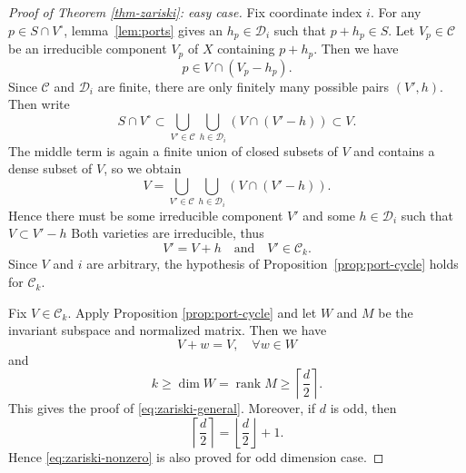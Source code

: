 \documentclass[11pt,reqno]{amsart}
\theoremstyle{definition}
\theoremstyle{plain}
\numberwithin{equation}{section}
\begin{document}
\begin{proof}[Proof of Theorem \ref{thm-zariski}: easy case]
    Fix coordinate index $i$. For any $p\in S\cap V^\circ$, lemma~\ref{lem:ports} gives an $h_p\in \mathcal{D}_i$ such that $p+h_p\in S$. Let $V_p \in \mathcal{C}$ be an irreducible component $V_p$ of $X$ containing $p+h_p$. Then we have
    \begin{equation*}
        p\in V\cap (V_p-h_p).
    \end{equation*}
    Since $\mathcal{C}$ and $\mathcal{D}_i$ are finite, there are only finitely many possible pairs $(V',h)$. Then write
    \begin{equation*}
        S\cap V^\circ \subset \bigcup_{V'\in \mathcal{C}}\bigcup_{h\in \mathcal{D}_i}(V\cap (V'-h))\subset V.
    \end{equation*}
    The middle term is again a finite union of closed subsets of $V$ and contains a dense subset of $V$, so we obtain
    \begin{equation*}
         V = \bigcup_{V'\in \mathcal{C}}\bigcup_{h\in \mathcal{D}_i}(V\cap (V'-h)).
    \end{equation*}
    Hence there must be some irreducible component $V'$ and some $h\in \mathcal{D}_i$ such that $V\subset V'-h$
    Both varieties are irreducible, thus
    \begin{equation*}
        V'=V+h \quad \text{and}\quad V'\in \mathcal{C}_k.
    \end{equation*}    
    Since $V$ and $i$ are arbitrary, the hypothesis of Proposition~\ref{prop:port-cycle} holds for $\mathcal{C}_k$.

    Fix $V\in \mathcal{C}_k$. Apply Proposition \ref{prop:port-cycle} and let $W$ and $M$ be the invariant subspace and normalized matrix. Then we have
    \begin{equation*}
        V+w=V,\quad \forall w\in W
    \end{equation*}
    and
    \begin{equation*}
        k\ge \dim W=\operatorname{rank}M\ge \left\lceil \frac{d}{2}\right\rceil.
    \end{equation*}
    This gives the proof of \eqref{eq:zariski-general}. Moreover, if $d$ is odd, then 
    \begin{equation*}
        \left\lceil \frac{d}{2}\right\rceil=\left\lfloor \frac{d}{2}\right\rfloor+1.
    \end{equation*}
    Hence \eqref{eq:zariski-nonzero} is also proved for odd dimension case.
\end{proof}
\end{document}
